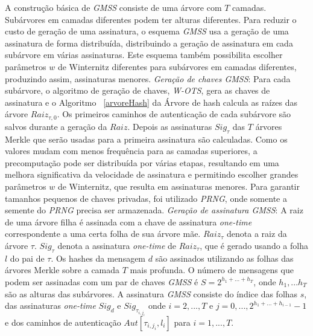 \documentclass{SBCbookchapter}
\begin{document}
\begin{otherlanguage}{brazilian}
A construção básica de \textit{GMSS} consiste de uma árvore com $T$ camadas. Subárvores em camadas diferentes podem ter alturas diferentes.
Para reduzir o custo de geração de uma assinatura, o esquema \textit{GMSS} usa a geração de uma assinatura de forma distribuída, distribuindo a geração de assinatura em cada subárvore em várias assinaturas. Este esquema também possibilita escolher parâmetros $w$ de Winternitz diferentes para subárvores em camadas diferentes, produzindo assim, assinaturas menores. 
\newline \newline \textit{Geração de chaves GMSS}: Para cada subárvore, o algoritmo de geração de chaves, \textit{W-OTS}, gera as chaves de assinatura e o Algoritmo ~\ref{arvoreHash} da Árvore de hash calcula as raízes das árvore $Raiz_{\tau ,0}$.
Os primeiros caminhos de autenticação de cada subárvore são salvos durante a geração da $Raiz$. 
Depois as assinaturas $Sig_{\tau}$ das $T$ árvores Merkle que serão usadas para a primeira assinatura são calculadas.
Como os va\-lores mudam com menos frequência para as camadas superiores, a  precomputação pode ser distribuída por várias etapas, resultando em uma melhora significativa da velocidade de assinatura e permitindo escolher grandes parâmetros $w$ de Winternitz, que resulta em assinaturas menores. 
Para garantir tamanhos pequenos de chaves privadas, foi utilizado \textit{PRNG}, onde somente a semente do \textit{PRNG} precisa ser armazenada.
\newline \newline \textit{Geração de assinatura GMSS}: A raiz de uma árvore filha é assinada com a chave de assinatura \textit{one-time} correspondente a uma certa folha de sua árvore mãe. 
$Raiz_{\tau}$ denota a raiz da árvore $\tau$.  $Sig_{\tau}$ denota a assinatura \textit{one-time} de $Raiz_{\tau}$, que é gerado usando a folha $l$ do pai de $\tau$. Os hashes da mensagem $d$ são assinados utilizando as folhas das árvores Merkle sobre a camada $T$ mais profunda. 
O número de mensagens que podem ser assinadas com um par de chaves \textit{GMSS} é $S = 2^{h_1 +...+ h_T}$, onde $h_1,...h_T$ são as alturas das subárvores. 
A assinatura \textit{GMSS} consiste do índice das folhas $s$, das assinaturas \textit{one-time} $Sig_d$ e $Sig_{\tau_{i,j_i}}$ onde $i=2,...,T$  e $j=0,...,2^{h_1+...+h_{i-1}}-1$ e dos caminhos de autenticação $Aut[\tau_{i,j_i},l_i]$ para $i=1,...,T$.


\end{otherlanguage}
\end{document}
